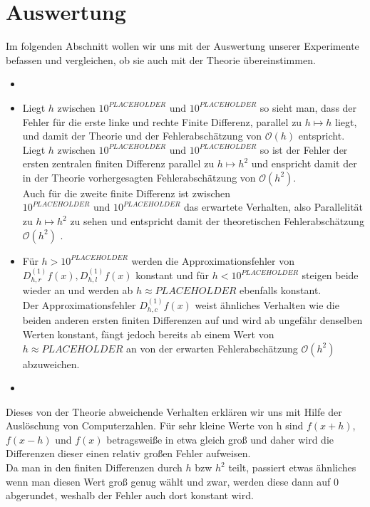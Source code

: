 \documentclass{scrartcl}
\theoremstyle{remark}
\begin{document}



\section{Auswertung}
Im folgenden Abschnitt wollen wir uns mit der Auswertung unserer Experimente
befassen und vergleichen, ob sie auch mit der Theorie übereinstimmen.



\begin{itemize}

  \item %
 
  \item Liegt \(h\) zwischen \(10^{ PLACEHOLDER } \text{ und } 10^{ PLACEHOLDER } \)
        so sieht man, dass der Fehler für die erste linke und rechte Finite Differenz, parallel zu \(h \mapsto h\)
        liegt, und damit der Theorie und der Fehlerabschätzung von \(\mathcal{O}(h)\) entspricht. \\
        Liegt \(h\) zwischen \(10^{ PLACEHOLDER } \text{ und } 10^{ PLACEHOLDER } \) 
        so ist der Fehler der ersten zentralen finiten Differenz parallel zu \(h \mapsto h^{2}\) und enspricht damit der in der Theorie vorhergesagten
        Fehlerabschätzung von \(\mathcal{O}(h^{2})\). \\
        Auch für die zweite finite Differenz ist zwischen \(10^{ PLACEHOLDER } \text{ und } 10^{ PLACEHOLDER }\) das erwartete Verhalten, also Parallelität zu
        \(h \mapsto h^{2}\) zu sehen und entspricht damit der theoretischen Fehlerabschätzung \(\mathcal{O}(h^{2})\) .
  \item Für \(h > 10^{ PLACEHOLDER } \) werden die Approximationsfehler von \(D_{h, r}^{(1)}f(x), D_{h, l}^{(1)}f(x)\)  konstant und für 
        \(h < 10^{ PLACEHOLDER } \) steigen beide wieder an und werden ab \(h \approx  PLACEHOLDER \) ebenfalls konstant. \\
        Der Approximationsfehler \(D_{h, c}^{(1)}f(x)\) weist ähnliches Verhalten wie die beiden anderen ersten finiten Differenzen auf und wird ab ungefähr denselben
        Werten konstant, fängt jedoch bereits ab einem Wert von \(h \approx PLACEHOLDER\) an von der erwarten Fehlerabschätzung \(\mathcal{O}(h^{2})\) abzuweichen.
  \item

\end{itemize}
Dieses von der Theorie abweichende Verhalten erklären wir uns mit Hilfe der Auslöschung von Computerzahlen. Für sehr kleine Werte von h sind
\(f(x + h)\), \(f(x - h)\) und \(f(x)\) betragsweiße in etwa gleich groß und daher wird die Differenzen dieser einen relativ großen Fehler aufweisen. \\
Da man in den finiten Differenzen durch \(h\) bzw \(h^{2}\) teilt, passiert etwas ähnliches wenn man diesen Wert groß genug wählt und zwar, werden diese dann auf 0 abgerundet,
weshalb der Fehler auch dort konstant wird.
\end{document}
